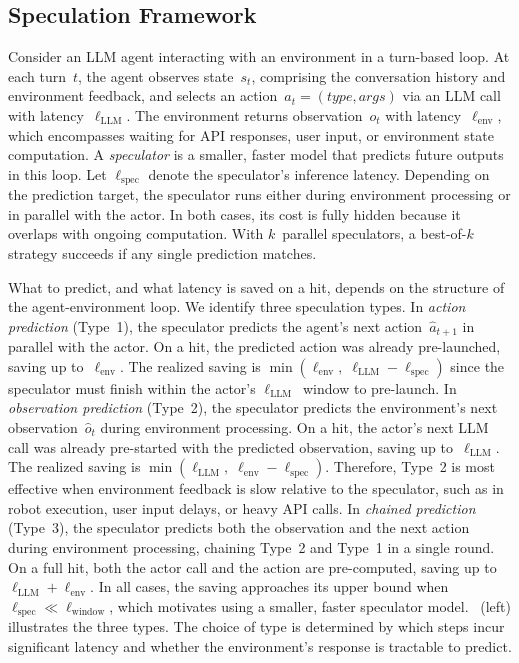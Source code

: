 \documentclass{article}
\begin{document}
\subsection{Speculation Framework}
\label{sec:method:framework}
Consider an LLM agent interacting with an environment in a turn-based loop. At each turn~$t$, the agent observes state~$s_t$, comprising the conversation history and environment feedback, and selects an action~$a_t = (\textit{type}, \textit{args})$ via an LLM call with latency~$\ell_{\text{LLM}}$. The environment returns observation~$o_t$ with latency~$\ell_{\text{env}}$, which encompasses waiting for API responses, user input, or environment state computation. A \emph{speculator} is a smaller, faster model that predicts future outputs in this loop. Let $\ell_{\text{spec}}$ denote the speculator's inference latency. Depending on the prediction target, the speculator runs either during environment processing or in parallel with the actor. In both cases, its cost is fully hidden because it overlaps with ongoing computation. With $k$~parallel speculators, a best-of-$k$ strategy succeeds if any single prediction matches.

What to predict, and what latency is saved on a hit, depends on the structure of the agent-environment loop. We identify three speculation types. In \emph{action prediction} (Type~1), the speculator predicts the agent's next action~$\hat{a}_{t+1}$ in parallel with the actor. On a hit, the predicted action was already pre-launched, saving up to~$\ell_{\text{env}}$. The realized saving is $\min(\ell_{\text{env}},\; \ell_{\text{LLM}} - \ell_{\text{spec}})$ since the speculator must finish within the actor's $\ell_{\text{LLM}}$~window to pre-launch. In \emph{observation prediction} (Type~2), the speculator predicts the environment's next observation~$\hat{o}_t$ during environment processing. On a hit, the actor's next LLM call was already pre-started with the predicted observation, saving up to~$\ell_{\text{LLM}}$. The realized saving is $\min(\ell_{\text{LLM}},\; \ell_{\text{env}} - \ell_{\text{spec}})$. Therefore, Type~2 is most effective when environment feedback is slow relative to the speculator, such as in robot execution, user input delays, or heavy API calls. In \emph{chained prediction} (Type~3), the speculator predicts both the observation and the next action during environment processing, chaining Type~2 and Type~1 in a single round. On a full hit, both the actor call and the action are pre-computed, saving up to $\ell_{\text{LLM}} + \ell_{\text{env}}$. In all cases, the saving approaches its upper bound when $\ell_{\text{spec}} \ll \ell_{\text{window}}$, which motivates using a smaller, faster speculator model. ~(left) illustrates the three types. The choice of type is determined by which steps incur significant latency and whether the environment's response is tractable to predict.
\end{document}
